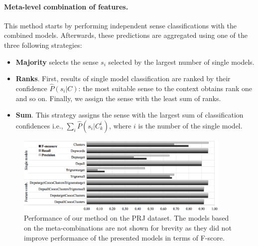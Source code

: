 \documentclass[11pt]{article}
\newenvironment{itemize2}
    {\begin{itemize}
        \vspace{-0.2em}
        \setlength{\abovedisplayskip}{0pt}
        \setlength{\belowdisplayskip}{0pt}
        \setlength{\itemsep}{5pt}
        \setlength{\parskip}{0pt}
        \setlength{\parsep}{0pt}
        \setlength{\topsep}{0pt}
        \setlength{\partopsep}{0pt}
    }
    {\vspace{-0.2em}
    \end{itemize}}
\begin{document}
\paragraph{Meta-level combination of features.} This method starts by performing independent sense classifications with the combined models. Afterwards, these predictions are aggregated using one of the three following strategies:

\begin{itemize2}

\item \textbf{Majority} selects the sense $s_i$ selected by the largest number of single models. 
\item \textbf{Ranks}. First, results of single model classification are ranked by their confidence $\hat{P}(s_i|C)$: the most suitable sense to the context obtains rank one and so on. Finally, we assign the sense with the least sum of ranks.
\item \textbf{Sum}. This strategy assigns the sense with the largest sum of classification confidences i.e., $\sum_i\hat{P}(s_i|C^i_k)$, where $i$ is the number of the single model.  
\end{itemize2}



\begin{figure}
\begin{center}
\includegraphics[width=0.92\textwidth]{figures/prj}
\end{center}
\caption{Performance of our method on the PRJ dataset. The models based on the meta-combinations are not shown for brevity as they did not improve performance of the presented models in terms of F-score. }
\label{tbl:results-prj}
\end{figure}
\end{document}
